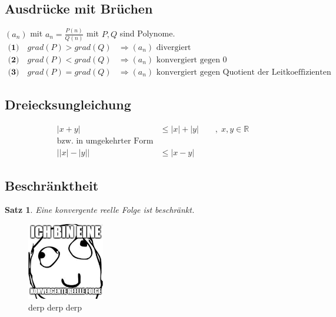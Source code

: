\documentclass[12pt,a4paper]{article}%
\newtheorem{satz}{Satz}[section]
\numberwithin{equation}{section}
\newcommand{\R}{\mathbb{R}} %
\numberwithin{equation}{subsection}
\begin{document}
  \subsection{Ausdrücke mit Brüchen}
  $(a_n)$ mit $a_n = \frac{P(n)}{Q(n)}$ mit $P,Q$ sind Polynome.
  \begin{align*}
    \textbf{(1)}\quad grad(P) > grad(Q) &\Rightarrow (a_n) \text{ divergiert} \\
    \textbf{(2)}\quad grad(P) < grad(Q) &\Rightarrow (a_n) \text{ konvergiert gegen } 0\\
    \textbf{(3)}\quad grad(P) = grad(Q) &\Rightarrow (a_n) \text{ konvergiert gegen Quotient der Leitkoeffizienten}
  \end{align*}   
  
  \subsection{Dreiecksungleichung}
  \begin{align}
    |x+y| &\leq |x| + |y| \qquad ,\; x,y \in \R \\
    \text{bzw. in umgekehrter Form} \nonumber \\
    \big| |x| - |y| \big| &\leq |x-y|
  \end{align}
  
  \subsection{Beschränktheit}
  \begin{satz}
    Eine konvergente reelle Folge ist beschränkt.
  \end{satz}
  \begin{figure}[H] 
	  \centering
	  \includegraphics[width=0.3\textwidth]{beschraenkt.jpg}
	  \caption{derp derp derp}
	  \label{fig:folge_epsilon}
	\end{figure}
  
\end{document}
